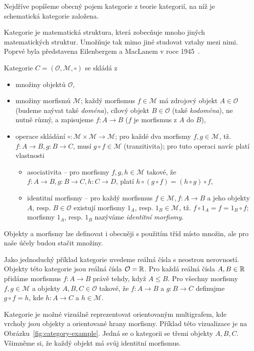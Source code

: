 Nejdříve popíšeme obecný pojem kategorie z teorie kategorií, na níž je schematická kategorie založena.

Kategorie je matematická struktura, která zobecňuje mnoho jiných matematických struktur.
Umožňuje tak mimo jiné studovat vztahy mezi nimi.
Poprvé byla představena Eilenbergem a MacLanem v roce 1945~\cite{eilenberg_generaltheory_1945}.

Kategorie $C=(\mathcal O, \mathcal M, \circ)$ se skládá
z \begin{itemize}
  \item množiny objektů $\mathcal O$,
  \item množiny morfismů $\mathcal M$; každý morfismus $f \in \mathcal M$ má zdrojový objekt $A\in\mathcal O$ (budeme naývat také \emph{doména}), cílový objekt $B\in\mathcal O$ (také \emph{kodoména}), ne nutně různý, a zapisujeme $f: A\to B$ ($f$ je morfismus z $A$ do $B$),
  \item operace skládání $\circ\colon \mathcal M\times\mathcal M \to \mathcal M$; pro každé dva morfismy $f,g\in\mathcal M$, tž. $f\colon A\to B, g\colon B\to C$, musí $g\circ f\in \mathcal M$ (tranzitivita); pro tuto operaci navíc platí vlastnosti
        \begin{itemize}
          \item asociativita -- pro morfismy $f,g,h\in\mathcal M$ takové, že $f\colon A\to B, g\colon B\to C, h\colon C\to D$, platí $h\circ (g \circ f) = (h\circ g)\circ f$,
          \item identitní morfismy -- pro každý morfismus $f\in\mathcal M, f\colon A\to B$ a jeho objekty $A$, resp. $B\in\mathcal O$ existují morfismy $1_A$, resp. $1_B\in\mathcal M$, tž. $f\circ 1_A = f = 1_B\circ f$; morfismy $1_A$, resp. $1_B$ nazýváme \emph{identitní morfismy}.
        \end{itemize}
\end{itemize}

Objekty a morfismy lze definovat i obecněji s použitím tříd místo množin, ale pro naše účely budou stačit množiny.

Jako jednoduchý příklad kategorie uvedeme reálná čísla s neostrou nerovností.
Objekty této kategorie jsou reálná čísla $\mathcal O=\mathbb{R}$.
Pro každá reálná čísla $A,B\in\mathbb{R}$ přidáme morfismus $f\colon A\to B$ právě tehdy, když $A\leq B$.
Pro všechny morfismy $f,g\in\mathcal M$ a objekty $A, B, C\in\mathcal O$ takové, že $f\colon A\to B$ a $g\colon B\to C$ definujme $g\circ f=h$, kde $h\colon A\to C$ a $h\in\mathcal M$.

Kategorie je možné vizuálně reprezentovat orientovaným multigrafem, kde vrcholy jsou objekty a orientované hrany morfismy.
Příklad této vizualizace je na Obrázku~\ref{fig:category-example}.
Jedná se o kategorii se třemi objekty $A, B, C$.
Všimněme si, že každý objekt má svůj identitní morfismus.

